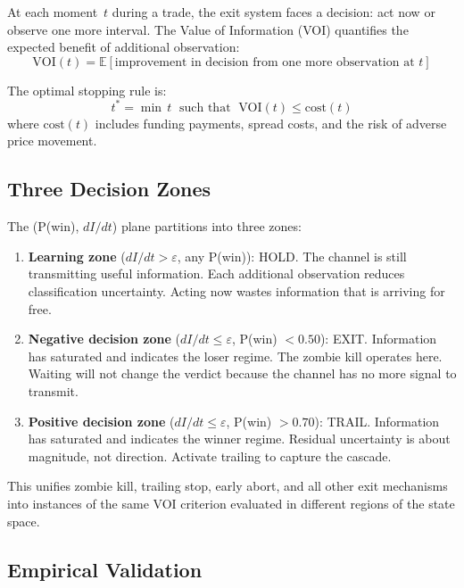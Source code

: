 \documentclass[11pt,a4paper]{article}
\newcommand{\E}{\mathbb{E}}
\begin{document}
At each moment~$t$ during a trade, the exit system faces a decision: act now or observe one more interval. The Value of Information (VOI) quantifies the expected benefit of additional observation:
\begin{equation}
\text{VOI}(t) = \E[\text{improvement in decision from one more observation at } t]
\end{equation}

The optimal stopping rule is:
\begin{equation}
t^* = \min\, t \;\text{ such that }\; \text{VOI}(t) \leq \text{cost}(t)
\end{equation}
where $\text{cost}(t)$ includes funding payments, spread costs, and the risk of adverse price movement.

\subsection{Three Decision Zones}

The (P(win), $dI/dt$) plane partitions into three zones:

\begin{enumerate}[leftmargin=2em]
\item \textbf{Learning zone} ($dI/dt > \varepsilon$, any P(win)): HOLD. The channel is still transmitting useful information. Each additional observation reduces classification uncertainty. Acting now wastes information that is arriving for free.
\item \textbf{Negative decision zone} ($dI/dt \leq \varepsilon$, P(win) $< 0.50$): EXIT. Information has saturated and indicates the loser regime. The zombie kill operates here. Waiting will not change the verdict because the channel has no more signal to transmit.
\item \textbf{Positive decision zone} ($dI/dt \leq \varepsilon$, P(win) $> 0.70$): TRAIL. Information has saturated and indicates the winner regime. Residual uncertainty is about magnitude, not direction. Activate trailing to capture the cascade.
\end{enumerate}

This unifies zombie kill, trailing stop, early abort, and all other exit mechanisms into instances of the same VOI criterion evaluated in different regions of the state space.

\subsection{Empirical Validation}
\end{document}
